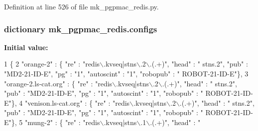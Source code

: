 Definition at line 526 of file mk\-\_\-pgpmac\-\_\-redis.\-py.

\hypertarget{namespacemk__pgpmac__redis_a9dc9b1bd47efd207604312cd60637526}{
\subsubsection[{configs}]{\setlength{\rightskip}{0pt plus 5cm}dictionary mk\-\_\-pgpmac\-\_\-redis.\-configs}}\label{namespacemk__pgpmac__redis_a9dc9b1bd47efd207604312cd60637526}
{\bfseries Initial value\-:}
\begin{DoxyCode}
1 \{
2     \textcolor{stringliteral}{"orange-2"}            : \{ \textcolor{stringliteral}{"re"} : \textcolor{stringliteral}{"redis\(\backslash\).kvseq|stns\(\backslash\).2\(\backslash\).(.+)"}, \textcolor{stringliteral}{"head"} : \textcolor{stringliteral}{"
      stns.2"}, \textcolor{stringliteral}{"pub"} : \textcolor{stringliteral}{"MD2-21-ID-E"}, \textcolor{stringliteral}{"pg"} : \textcolor{stringliteral}{"1"}, \textcolor{stringliteral}{"autoscint"} : \textcolor{stringliteral}{"1"}, \textcolor{stringliteral}{"robopub"} : \textcolor{stringliteral}{"
      ROBOT-21-ID-E"}\},
3     \textcolor{stringliteral}{"orange-2.ls-cat.org"} : \{ \textcolor{stringliteral}{"re"} : \textcolor{stringliteral}{"redis\(\backslash\).kvseq|stns\(\backslash\).2\(\backslash\).(.+)"}, \textcolor{stringliteral}{"head"} : \textcolor{stringliteral}{"
      stns.2"}, \textcolor{stringliteral}{"pub"} : \textcolor{stringliteral}{"MD2-21-ID-E"}, \textcolor{stringliteral}{"pg"} : \textcolor{stringliteral}{"1"}, \textcolor{stringliteral}{"autoscint"} : \textcolor{stringliteral}{"1"}, \textcolor{stringliteral}{"robopub"} : \textcolor{stringliteral}{"
      ROBOT-21-ID-E"}\},
4     \textcolor{stringliteral}{"venison.ls-cat.org"}  : \{ \textcolor{stringliteral}{"re"} : \textcolor{stringliteral}{"redis\(\backslash\).kvseq|stns\(\backslash\).2\(\backslash\).(.+)"}, \textcolor{stringliteral}{"head"} : \textcolor{stringliteral}{"
      stns.2"}, \textcolor{stringliteral}{"pub"} : \textcolor{stringliteral}{"MD2-21-ID-E"}, \textcolor{stringliteral}{"pg"} : \textcolor{stringliteral}{"1"}, \textcolor{stringliteral}{"autoscint"} : \textcolor{stringliteral}{"1"}, \textcolor{stringliteral}{"robopub"} : \textcolor{stringliteral}{"
      ROBOT-21-ID-E"}\},
5     \textcolor{stringliteral}{"mung-2"}              : \{ \textcolor{stringliteral}{"re"} : \textcolor{stringliteral}{"redis\(\backslash\).kvseq|stns\(\backslash\).1\(\backslash\).(.+)"}, \textcolor{stringliteral}{"head"} : \textcolor{stringliteral}{"
}
\end{DoxyCode}
